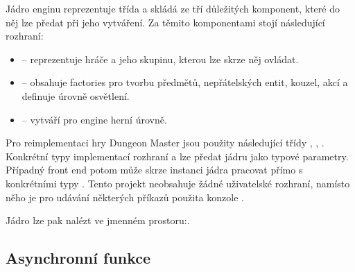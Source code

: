 Jádro enginu reprezentuje třída  a skládá ze tří důležitých komponent, které do něj lze předat při jeho vytváření. 
Za těmito komponentami stojí následující rozhraní:

\begin{itemize}
\item {} -- reprezentuje hráče a jeho skupinu, kterou lze skrze něj ovládat.
\item {} -- obsahuje factories pro tvorbu předmětů, nepřátelských entit, kouzel, akcí a definuje úrovně osvětlení.
\item {} -- vytváří pro engine herní úrovně.
\end{itemize}


Pro reimplementaci hry Dungeon Master jsou použity následující třídy ,
, . Konkrétní typy implementací rozhraní
 a  lze předat jádru jako typové parametry.
Případný front end potom může skrze instanci jádra pracovat přímo s konkrétními typy . Tento projekt
neobsahuje žádné uživatelské rozhraní, namísto něho je pro udávání některých příkazů použita konzole .

Jádro lze pak nalézt ve jmenném prostoru:\newline {}.



\subsection{Asynchronní funkce}\label{async-engine}

